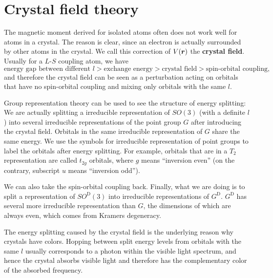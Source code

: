 \documentclass[hyperref, a4paper]{article}
\newcommand*{\concept}[1]{{\textbf{#1}}}
\begin{document}
\section{Crystal field theory}

The magnetic moment derived for isolated atoms often does not work well for atoms in a crystal. 
The reason is clear, since an electron is actually surrounded by other atoms in the crystal.
We call this correction of $V(\vb*{r})$ the \concept{crystal field}.
Usually for a $L$-$S$ coupling atom, we have 
\[
    \text{energy gap between different $l$} > \text{exchange energy} > \text{crystal field} > \text{spin-orbital coupling},
\]
and therefore the crystal field can be seen as a perturbation acting on orbitals that have no spin-orbital coupling and mixing only 
orbitals with the same $l$.

Group representation theory can be used to see the structure of energy splitting: 
We are actually splitting a irreducible representation of $SO(3)$ (with a definite $l$) into several 
irreducible representations of the point group $G$ after introducing the crystal field.
Orbitals in the same irreducible representation of $G$ share the same energy.
We use the symbols for irreducible representation of point groups to label the orbitals after energy splitting.
For example, orbitals that are in a $T_2$ representation are called $t_{2g}$ orbitals, where $g$ means 
``inversion even'' (on the contrary, subscript $u$ means ``inversion odd'').

We can also take the spin-orbital coupling back. Finally, what we are doing is to split a representation 
of $SO^\text{D}(3)$ into irreducible representations of $G^\text{D}$. $G^\text{D}$ has several more 
irreducible representation than $G$, the dimensions of which are always even, which comes from Kramers degeneracy.

The energy splitting caused by the crystal field is the underlying reason why crystals have colors. 
Hopping between split energy levels from orbitals with the same $l$ usually corresponds to a photon within 
the visible light spectrum, and hence the crystal absorbs visible light and therefore has the complementary 
color of the absorbed frequency. 
\end{document}
